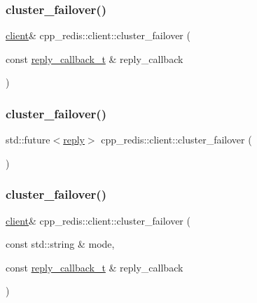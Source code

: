 \subsubsection{\texorpdfstring{cluster\+\_\+failover()}{cluster\_failover()}\hspace{0.1cm}{\footnotesize\ttfamily [1/4]}}
{\footnotesize\ttfamily \hyperlink{classcpp__redis_1_1client}{client}\& cpp\+\_\+redis\+::client\+::cluster\+\_\+failover (\begin{DoxyParamCaption}\item[{const \hyperlink{classcpp__redis_1_1client_a061a1140d36d2eaeda82b09a0bb3f9f2}{reply\+\_\+callback\+\_\+t} \&}]{reply\+\_\+callback }\end{DoxyParamCaption})}

\mbox{\label{classcpp__redis_1_1client_a76122bb138c12b90c78c4e511f45ef17}} 
\subsubsection{\texorpdfstring{cluster\+\_\+failover()}{cluster\_failover()}\hspace{0.1cm}{\footnotesize\ttfamily [2/4]}}
{\footnotesize\ttfamily std\+::future$<$\hyperlink{classcpp__redis_1_1reply}{reply}$>$ cpp\+\_\+redis\+::client\+::cluster\+\_\+failover (\begin{DoxyParamCaption}{ }\end{DoxyParamCaption})}

\mbox{\label{classcpp__redis_1_1client_a9c95de64e422c09c2180dc69db386d06}} 
\subsubsection{\texorpdfstring{cluster\+\_\+failover()}{cluster\_failover()}\hspace{0.1cm}{\footnotesize\ttfamily [3/4]}}
{\footnotesize\ttfamily \hyperlink{classcpp__redis_1_1client}{client}\& cpp\+\_\+redis\+::client\+::cluster\+\_\+failover (\begin{DoxyParamCaption}\item[{const std\+::string \&}]{mode,  }\item[{const \hyperlink{classcpp__redis_1_1client_a061a1140d36d2eaeda82b09a0bb3f9f2}{reply\+\_\+callback\+\_\+t} \&}]{reply\+\_\+callback }\end{DoxyParamCaption})}

